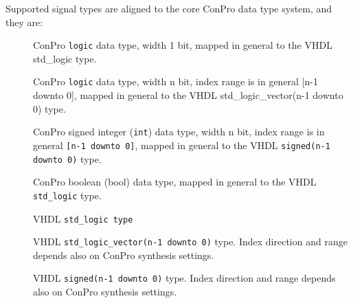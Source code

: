\documentclass[a4paper,12pt,twoside,english]{article}
\begin{document}
\begin{description}
\begin{description}
\end{description}
Supported signal types are aligned to the core ConPro data type system, and they are:


\begin{description}
\item[] $ $\\
ConPro {\tt logic} data type,  width 1 bit, mapped in general to the VHDL std\_logic type. 

\item[] $ $\\
ConPro {\tt logic} data type, width n bit, index range is in general {[}n-1 downto 0{]}, mapped in general to the VHDL std\_logic\_vector(n-1 downto 0)  type.

\item[] $ $\\
ConPro signed integer ({\tt int}) data type, width n bit, index range is in general {\tt {[}n-1 downto 0{]}}, mapped in general to the VHDL {\tt signed(n-1
downto 0)}  type.

\item[] $ $\\
ConPro boolean (bool) data type,   mapped in general to the VHDL {\tt std\_logic} type.

\item[] $ $\\
VHDL {\tt std\_logic type} 

\item[] $ $\\
VHDL {\tt std\_logic\_vector(n-1 downto 0)} type. Index direction and range depends also on ConPro synthesis settings.

\item[] $ $\\
VHDL {\tt signed(n-1 downto 0)}  type. Index direction and range depends also on ConPro synthesis settings.


\end{description}




\end{description}
\end{document}
